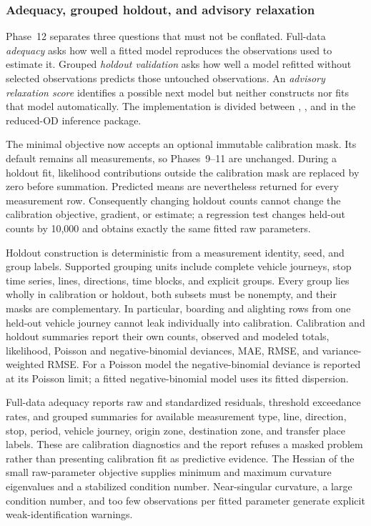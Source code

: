 \subsubsection{Adequacy, grouped holdout, and advisory relaxation}
\label{sec:reduced-od-validation}

Phase~12 separates three questions that must not be conflated.  Full-data
\emph{adequacy} asks how well a fitted model reproduces the observations used
to estimate it.  Grouped \emph{holdout validation} asks how well a model refitted
without selected observations predicts those untouched observations.  An
\emph{advisory relaxation score} identifies a possible next model but neither
constructs nor fits that model automatically.  The implementation is divided
between , , and  in
the reduced-OD inference package.

The minimal objective now accepts an optional immutable calibration mask.  Its
default remains all measurements, so Phases~9--11 are unchanged.  During a
holdout fit, likelihood contributions outside the calibration mask are replaced
by zero before summation.  Predicted means are nevertheless returned for every
measurement row.  Consequently changing holdout counts cannot change the
calibration objective, gradient, or estimate; a regression test changes held-out
counts by 10,000 and obtains exactly the same fitted raw parameters.

Holdout construction is deterministic from a measurement identity, seed, and
group labels.  Supported grouping units include complete vehicle journeys,
stop time series, lines, directions, time blocks, and explicit groups.  Every
group lies wholly in calibration or holdout, both subsets must be nonempty, and
their masks are complementary.  In particular, boarding and alighting rows
from one held-out vehicle journey cannot leak individually into calibration.
Calibration and holdout summaries report their own counts, observed and modeled
totals, likelihood, Poisson and negative-binomial deviances, MAE, RMSE, and
variance-weighted RMSE.  For a Poisson model the negative-binomial deviance is
reported at its Poisson limit; a fitted negative-binomial model uses its fitted
dispersion.

Full-data adequacy reports raw and standardized residuals, threshold exceedance
rates, and grouped summaries for available measurement type, line, direction,
stop, period, vehicle journey, origin zone, destination zone, and transfer
place labels.  These are calibration diagnostics and the report refuses a
masked problem rather than presenting calibration fit as predictive evidence.
The Hessian of the small raw-parameter objective supplies minimum and maximum
curvature eigenvalues and a stabilized condition number.  Near-singular
curvature, a large condition number, and too few observations per fitted
parameter generate explicit weak-identification warnings.

